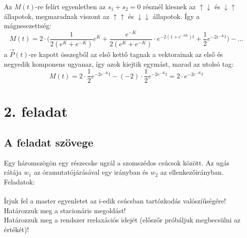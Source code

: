 \documentclass[12pt]{article}
\begin{document}
Az $M(t)$-re felírt egyenletben az $s_1+s_2 = 0$ résznél kiesnek az $\uparrow\downarrow$ és $\downarrow\uparrow$ állapotok, megmaradnak viszont az $\uparrow\uparrow$ és $\downarrow\downarrow$ állapotok. Így a mágnesezettség:
$$ M(t) = 2\cdot \big (\frac{1}{2(e^K+e^{-K})} e^K + \frac{e^{-K}}{2(e^K+e^{-K})}\cdot e^{-2(1 + e^{-2K})t} + \frac{1}{2}e^{-2e^{-K}t} \big ) - ...$$ 
a $\vec{P}(t)$-re kapott összegből az első kettő tagnak a vektorainak az első és negyedik komponens ugyanaz, így azok kiejtik egymást, marad az utolsó tag:
$$M(t) = 2\cdot\frac{1}{2}e^{-2e^{-K}t}- (-2)\cdot\frac{1}{2}e^{-2e^{-K}t} = 2\cdot e^{-2e^{-K}t} $$

\newpage
\section*{2. feladat}
\subsection*{A feladat szövege}
Egy háromszögön egy részecske ugrál a szomszédos csúcsok között. Az ugás rátája $w_1$
az óramutatójárásával egy irányban és $w_2$ az ellenkezőirányban. Feladatok:\\\\
Írjuk fel a master egyenletet az i-edik csúcsban tartózkodás valószíűségére!\\ 
Határozzuk meg a stacionáris megoldást!\\
Határozzuk meg a rendszer rrelaxációs idejét  (előszőr próbáljuk megbecsülni az értékét)!
\end{document}
